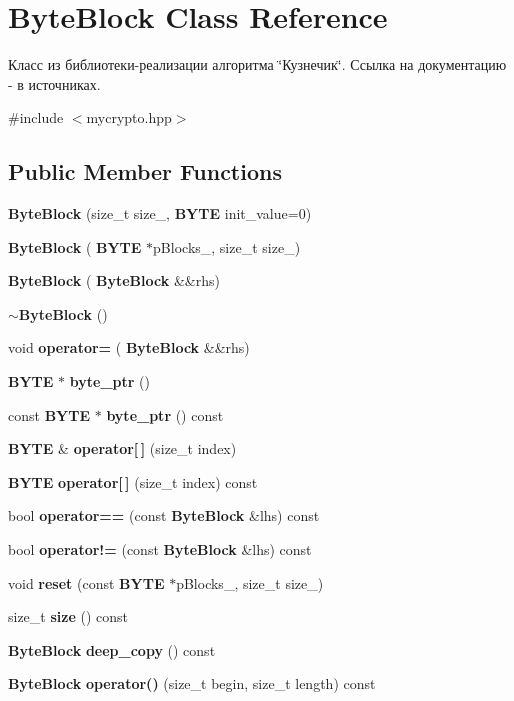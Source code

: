 \section{Byte\+Block Class Reference}
\label{class_byte_block}


Класс из библиотеки-\/реализации алгоритма \char`\"{}Кузнечик\char`\"{}. Ссылка на документацию -\/ в источниках.  




{\ttfamily \#include $<$mycrypto.\+hpp$>$}

\subsection*{Public Member Functions}
\begin{DoxyCompactItemize}
\item 
\textbf{ Byte\+Block} (size\+\_\+t size\+\_, \textbf{ B\+Y\+TE} init\+\_\+value=0)
\item 
\textbf{ Byte\+Block} (\textbf{ B\+Y\+TE} $\ast$p\+Blocks\+\_\+, size\+\_\+t size\+\_\+)
\item 
\textbf{ Byte\+Block} (\textbf{ Byte\+Block} \&\&rhs)
\item 
\textbf{ $\sim$\+Byte\+Block} ()
\item 
void \textbf{ operator=} (\textbf{ Byte\+Block} \&\&rhs)
\item 
\textbf{ B\+Y\+TE} $\ast$ \textbf{ byte\+\_\+ptr} ()
\item 
const \textbf{ B\+Y\+TE} $\ast$ \textbf{ byte\+\_\+ptr} () const
\item 
\textbf{ B\+Y\+TE} \& \textbf{ operator[$\,$]} (size\+\_\+t index)
\item 
\textbf{ B\+Y\+TE} \textbf{ operator[$\,$]} (size\+\_\+t index) const
\item 
bool \textbf{ operator==} (const \textbf{ Byte\+Block} \&lhs) const
\item 
bool \textbf{ operator!=} (const \textbf{ Byte\+Block} \&lhs) const
\item 
void \textbf{ reset} (const \textbf{ B\+Y\+TE} $\ast$p\+Blocks\+\_\+, size\+\_\+t size\+\_\+)
\item 
size\+\_\+t \textbf{ size} () const
\item 
\textbf{ Byte\+Block} \textbf{ deep\+\_\+copy} () const
\item 
\textbf{ Byte\+Block} \textbf{ operator()} (size\+\_\+t begin, size\+\_\+t length) const
\end{DoxyCompactItemize}
